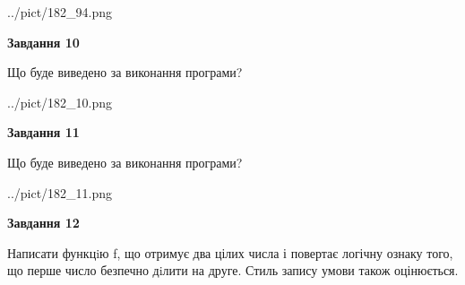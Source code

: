 \documentclass[12pt, ukrainian]{article}
\begin{document}
{\begin {large}
\begin{center}
	{../pict/182_94.png}
\end{center}
\newpage

{\begin {center}\textbf{Завдання 10}\end {center}}

Що буде виведено за виконання програми?\par
\begin{center}
	{../pict/182_10.png}
\end{center}
\newpage

{\begin {center}\textbf{Завдання 11}\end {center}}

Що буде виведено за виконання програми?\par
\begin{center}
	{../pict/182_11.png}
\end{center}
\newpage

{\begin {center}\textbf{Завдання 12}\end {center}}


Написати функцiю f, що отримує два цілих числа і повертає логічну ознаку того, що перше число безпечно дiлити на друге. Стиль запису умови також оцінюється.\par
\newpage

\end {large}}
\end{document}
